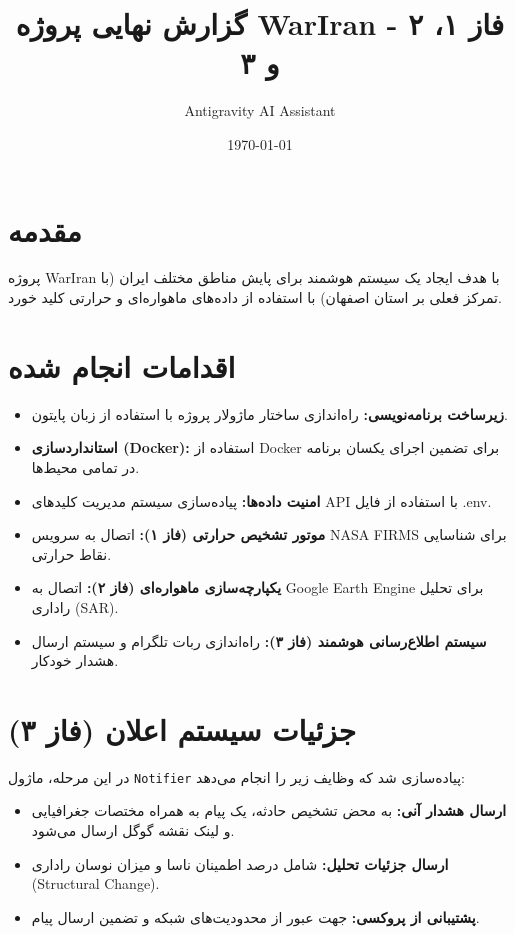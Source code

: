 \documentclass{article}
\title{گزارش نهایی پروژه WarIran - فاز ۱، ۲ و ۳}
\author{Antigravity AI Assistant}
\date{\today}
\begin{document}
\maketitle

\section{مقدمه}
پروژه WarIran با هدف ایجاد یک سیستم هوشمند برای پایش مناطق مختلف ایران (با تمرکز فعلی بر استان اصفهان) با استفاده از داده‌های ماهواره‌ای و حرارتی کلید خورد.

\section{اقدامات انجام شده}
\begin{itemize}
    \item \textbf{زیرساخت برنامه‌نویسی:} راه‌اندازی ساختار ماژولار پروژه با استفاده از زبان پایتون.
    \item \textbf{استانداردسازی (Docker):} استفاده از Docker برای تضمین اجرای یکسان برنامه در تمامی محیط‌ها.
    \item \textbf{امنیت داده‌ها:} پیاده‌سازی سیستم مدیریت کلیدهای API با استفاده از فایل .env.
    \item \textbf{موتور تشخیص حرارتی (فاز ۱):} اتصال به سرویس NASA FIRMS برای شناسایی نقاط حرارتی.
    \item \textbf{یکپارچه‌سازی ماهواره‌ای (فاز ۲):} اتصال به Google Earth Engine برای تحلیل راداری (SAR).
    \item \textbf{سیستم اطلاع‌رسانی هوشمند (فاز ۳):} راه‌اندازی ربات تلگرام و سیستم ارسال هشدار خودکار.
\end{itemize}

\section{جزئیات سیستم اعلان (فاز ۳)}
در این مرحله، ماژول \texttt{Notifier} پیاده‌سازی شد که وظایف زیر را انجام می‌دهد:
\begin{itemize}
    \item \textbf{ارسال هشدار آنی:} به محض تشخیص حادثه، یک پیام به همراه مختصات جغرافیایی و لینک نقشه گوگل ارسال می‌شود.
    \item \textbf{ارسال جزئیات تحلیل:} شامل درصد اطمینان ناسا و میزان نوسان راداری (Structural Change).
    \item \textbf{پشتیبانی از پروکسی:} جهت عبور از محدودیت‌های شبکه و تضمین ارسال پیام.
\end{itemize}
\end{document}
